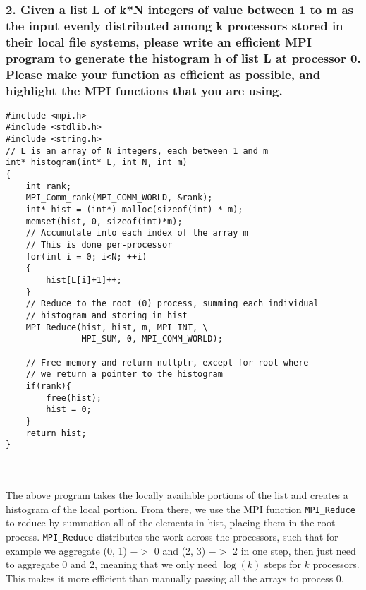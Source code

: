 \documentclass[titlepage]{article}
\def\code#1{\texttt{#1}}
\begin{document}
\subsubsection*{2. Given a list L of k*N integers of value between 1 to m as
the input evenly distributed among k processors stored in their local file
systems, please write an efficient MPI program to generate the histogram h of
list L at processor 0. Please make your function as efficient as possible, and
highlight the MPI functions that you are using.}
\begin{minipage}{\linewidth}
\begin{verbatim}
#include <mpi.h>
#include <stdlib.h>
#include <string.h>
// L is an array of N integers, each between 1 and m
int* histogram(int* L, int N, int m)
{
    int rank;
    MPI_Comm_rank(MPI_COMM_WORLD, &rank);
    int* hist = (int*) malloc(sizeof(int) * m);
    memset(hist, 0, sizeof(int)*m);
    // Accumulate into each index of the array m
    // This is done per-processor
    for(int i = 0; i<N; ++i)
    {
        hist[L[i]+1]++;
    }
    // Reduce to the root (0) process, summing each individual
    // histogram and storing in hist
    MPI_Reduce(hist, hist, m, MPI_INT, \
               MPI_SUM, 0, MPI_COMM_WORLD);
    
    // Free memory and return nullptr, except for root where
    // we return a pointer to the histogram
    if(rank){
        free(hist);
        hist = 0;
    }
    return hist;
}
\end{verbatim}
\end{minipage} \\\\
The above program takes the locally available portions of the list and creates
a histogram of the local portion. From there, we use the MPI function 
\code{MPI\_Reduce} to reduce by summation all of the elements in hist, placing
them in the root process. \code{MPI\_Reduce} distributes the work
across the processors, such that for example we aggregate (0, 1) $->$ 0 and
(2, 3) $->$ 2 in one step, then just need to aggregate 0 and 2, meaning that
we only need $\log(k)$ steps for $k$ processors. This makes it more efficient
than manually passing all the arrays to process 0.
\end{document}
